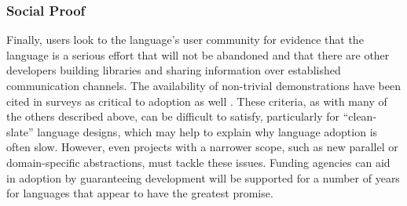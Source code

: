 \documentclass[12pt]{article}
\begin{document}
\subsubsection{Social Proof}
Finally, users look to the language's user community for evidence that the language is a serious effort that will not be abandoned and that there are other developers building libraries and sharing information over established communication channels. The availability of non-trivial demonstrations have been cited in surveys as critical to adoption as well \cite{basili2008understanding}. These criteria, as with many of the others described above, can be difficult to satisfy, particularly for ``clean-slate'' language designs, which may help to explain why language adoption is often slow. However, even projects with a narrower scope, such as new parallel or domain-specific abstractions, must tackle these issues. Funding agencies can aid in adoption by guaranteeing development will be supported for a number of years for languages that appear to have the greatest promise.

% 




%
%
\end{document}
